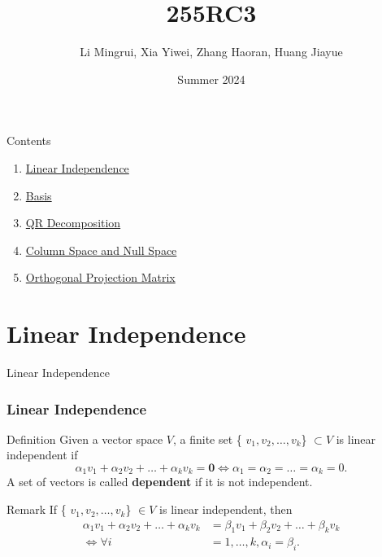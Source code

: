 \documentclass{beamer}
\title{\LARGE 255RC3}
\author{ Li Mingrui, Xia Yiwei, Zhang Haoran, Huang Jiayue}
\date{Summer 2024}
\begin{document}
\maketitle



\begin{frame}{Contents}
    \begin{enumerate}
        \item \hyperlink{1}{Linear Independence}
        \item \hyperlink{2}{Basis}
        \item \hyperlink{3}{QR Decomposition}
        \item \hyperlink{4}{Column Space and Null Space}
        \item \hyperlink{5}{Orthogonal Projection Matrix}
    \end{enumerate}
       
\end{frame}

    

\section{Linear Independence}
\begin{frame}[label=1]{Linear Independence}
    \frametitle{Linear Independence}
    \begin{block}{Definition}
        Given a vector space $V$, a finite set \{ $v_1,v_2,\dots,v_k$\} $\subset V$ is {linear independent} if 
        \begin{equation*}
            \alpha_1v_1+\alpha_2v_2+\dots+\alpha_kv_k=\mathbf{0}\Leftrightarrow\alpha_1=\alpha_2=\dots=\alpha_k=0.
        \end{equation*}
        A set of vectors is called \textbf{dependent} if it is not independent.
    \end{block}
    \begin{block}{Remark}
        If \{ $v_1,v_2,\dots,v_k$\} $\in V$ is {linear independent}, then
        \begin{align*}
    \alpha_1v_1+\alpha_2v_2+\dots+\alpha_kv_k&=\beta_1v_1+\beta_2v_2+\dots+\beta_kv_k\\
    \Leftrightarrow \forall i&=1,\dots,k,\alpha_i=\beta_i.
        \end{align*}
    \end{block}
\end{frame}
\end{document}
